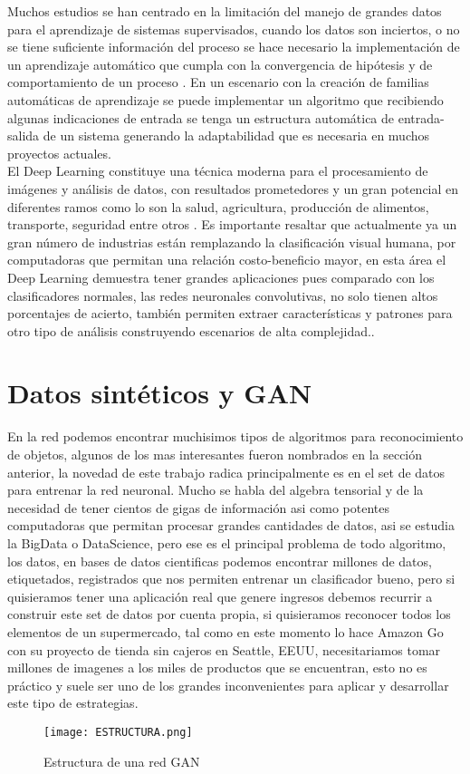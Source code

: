 \documentclass[conference]{IEEEtran}
\begin{document}
Muchos estudios se han centrado en la limitaci\'on del manejo de grandes datos para el aprendizaje de sistemas supervisados, cuando los datos son inciertos, o no se tiene suficiente informaci\'on del proceso se hace necesario la implementaci\'on de un aprendizaje autom\'atico que cumpla con la convergencia de hip\'otesis y de comportamiento de un proceso \cite{b7}. En un escenario con la creación de familias autom\'aticas de aprendizaje se puede implementar un algoritmo que recibiendo algunas indicaciones de entrada se tenga un estructura autom\'atica de entrada-salida de un sistema generando la adaptabilidad que es necesaria en muchos proyectos actuales\cite{b8}.\\

 El Deep Learning constituye una t\'ecnica moderna para el procesamiento de im\'agenes y an\'alisis de datos, con resultados prometedores y un gran potencial en diferentes ramos como lo son la salud, agricultura, producci\'on de alimentos, transporte, seguridad entre otros \cite{b9}.  Es importante resaltar que actualmente ya un gran número de industrias est\'an remplazando la clasificaci\'on visual humana, por computadoras que permitan una relaci\'on costo-beneficio mayor, en esta \'area el Deep Learning demuestra tener grandes aplicaciones pues comparado con los clasificadores normales, las redes neuronales convolutivas,  no solo tienen altos porcentajes de acierto, tambi\'en permiten extraer caracter\'isticas y patrones para otro tipo de an\'alisis construyendo escenarios de alta complejidad.\cite{b10}\cite{b11}.\\

\section{Datos sint\'eticos y GAN}
En la red podemos encontrar muchisimos tipos de algoritmos para reconocimiento de objetos, algunos de los mas interesantes fueron nombrados en la secci\'on anterior, la novedad de este trabajo radica principalmente es en el set de datos para entrenar la red neuronal. Mucho se habla del algebra tensorial y de la necesidad de tener cientos de gigas de informaci\'on asi como potentes computadoras que permitan procesar grandes cantidades de datos, asi se estudia la BigData o DataScience, pero ese es el principal problema de todo algoritmo, los datos, en bases de datos cientificas podemos encontrar millones de datos, etiquetados, registrados que nos permiten entrenar un clasificador bueno, pero si quisieramos tener una aplicaci\'on real que genere ingresos debemos recurrir a construir este set de datos por cuenta propia, si quisieramos reconocer todos los elementos de un supermercado, tal como en este momento lo hace Amazon Go con su proyecto de tienda sin cajeros en Seattle, EEUU, necesitariamos tomar millones de imagenes a los miles de productos que se encuentran, esto no es pr\'actico y suele ser uno de los grandes inconvenientes para aplicar y desarrollar este tipo de estrategias. 
\begin{figure}[H]
	\centering
	\texttt{[image: ESTRUCTURA.png]}
	\caption{Estructura de una red GAN}
	\label{fig:Resultado GAN}
\end{figure}
\end{document}
